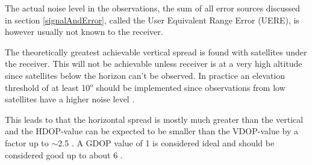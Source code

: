 The actual noise level in the observations, the sum of all error sources discussed in section \ref{signalAndError}, called the User Equivalent Range Error (UERE), is however usually not known to the receiver.
\par
The theoretically greatest achievable vertical spread is found with satellites under the receiver. This will not be achievable unless receiver is at a very high altitude since satellites below the horizon can't be observed. In practice an elevation threshold of at least 10$^o$ should be implemented since observations from low satellites have a higher noise level \cite{tatarnikov2014approaching}.
\par
This leads to that the horizontal spread is mostly much greater than the vertical and the HDOP-value can be expected to be smaller than the VDOP-value by a factor up to $\sim$2.5 \cite{langley1999dilution}. A GDOP value of 1 is considered ideal and should be considered good up to about 6 \cite{GDOPbelow6}.

